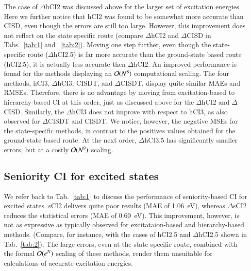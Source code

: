\documentclass[aip,jcp,reprint,noshowkeys,superscriptaddress]{revtex4-1}
\begin{document}

The case of $\Delta$hCI2 was discussed above for the larger set of excitation energies.
Here we further notice that hCI2 was found to be somewhat more accurate than CISD, even though the errors are still too large.
However, this improvement does not reflect on the state specific route (compare $\Delta$hCI2 and $\Delta$CISD in Tabs.~\ref{tab:1} and ~\ref{tab:2}).
Moving one step further, even though the state-specific route ($\Delta$hCI2.5) is far more accurate than the ground-state based route (hCI2.5),
it is actually less accurate then $\Delta$hCI2.
An improved performance is found for the methods displaying an $\order*{N^8}$ computational scaling.
The four methods, hCI3, $\Delta$hCI3, CISDT, and $\Delta$CISDT, display quite similar MAEs and RMSEs.
Therefore, there is no advantage by moving from excitation-based to hierarchy-based CI at this order, just as discussed above for the $\Delta$hCI2 and $\Delta$CISD.
Similarly, the $\Delta$hCI3 does not improve with respect to hCI3, as also observed for $\Delta$CISDT and CISDT. \cite{Kossoski_2023}
We notice, however, the negative MSEs for the state-specific methods, in contrast to the positives values obtained for the ground-state based route.
At the next order, $\Delta$hCI3.5 has significantly smaller errors, but at a costly $\order*{N^9}$ scaling.



\subsection{Seniority CI for excited states}
\label{sec:res_C}

We refer back to Tab.~\ref{tab:1} to discuss the performance of seniority-based CI for excited states.
sCI2 delivers quite poor results (MAE of \SI{1.06}{eV}), whereas $\Delta$sCI2 reduces the statistical errors (MAE of \SI{0.60}{eV}).
This improvement, however, is not as expressive as typically observed for excitataion-based and hierarchy-based methods.
(Compare, for instance, with the cases of hCI2.5 and $\Delta$hCI2.5 shown in Tab.~\ref{tab:2}).
The large errors, even at the state-specific route, combined with the formal $\order*{e^N}$ scaling of these methods,
render them unsuitable for calculations of accurate excitation energies.
\end{document}
